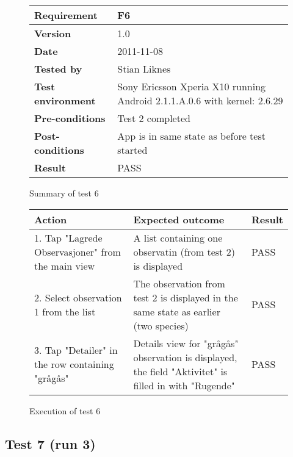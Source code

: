 	\begin{figure}[htb]
		\centering
		\begin{tabular}{|p{3.5cm}|p{7.0cm}|} \hline
			\textbf{Requirement} & F6 \\ \hline
			\textbf{Version} & 1.0 \\ \hline
			\textbf{Date} & 2011-11-08 \\ \hline
			\textbf{Tested by} & Stian Liknes \\ \hline
			\textbf{Test environment} & Sony Ericsson Xperia X10 running Android 2.1.1.A.0.6 with kernel: 2.6.29 \\ \hline
			\textbf{Pre-conditions} & Test 2 completed \\ \hline
			\textbf{Post-conditions} & App is in same state as before test started \\ \hline
			\textbf{Result} & PASS \\ \hline
		\end{tabular}
		\caption{Summary of test 6}
	\end{figure}

	\begin{figure}[htb]
		\centering
		\begin{tabular}{|p{5.0cm}|p{5.0cm}|p{1cm}|}
			\hline \textbf{Action} & \textbf{Expected outcome} & \textbf{Result} \\ \hline
				1. Tap "Lagrede Observasjoner" from the main view &
				A list containing one observatin (from test 2) is displayed &
				PASS \\ \hline

				2. Select observation 1 from the list &
				The observation from test 2 is displayed in the same state as
				earlier (two species) &
				PASS \\ \hline

				3. Tap "Detailer" in the row containing "grågås" &
				Details view for "grågås" observation is displayed, the field "Aktivitet"
				is filled in with "Rugende" &
				PASS \\ \hline
		\end{tabular}
		\caption{Execution of test 6}
	\end{figure}

\newpage
\subsection{Test 7 (run 3)}

